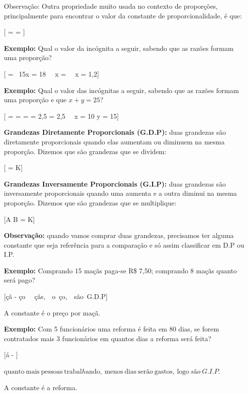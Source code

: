 {Observação}: Outra propriedade muito usada no contexto de proporções,
principalmente para encontrar o valor da constante de proporcionalidade,
é que:

[ =  = ]

\textbf{Exemplo:} Qual o valor da incógnita a seguir, sabendo que as
razões formam uma proporção?

[ = \  \rightarrow 15x = 18 \rightarrow \ \ x =  \rightarrow \ \ x = 1,2]

\textbf{Exemplo:} Qual o valor das incógnitas a seguir, sabendo que as
razões formam uma proporção e que \(x + y = 25\)?

[ =  =  =  = 2,5 = 2,5 \rightarrow \ \ x = 10 \rightarrow y = 15]

\textbf{{Grandezas Diretamente Proporcionais (G.D.P)}:} duas grandezas
são diretamente proporcionais quando elas aumentam ou diminuem na mesma
proporção. Dizemos que são grandezas que se dividem:

[ = K]

\textbf{{Grandezas Inversamente Proporcionais (G.I.P)}:} duas grandezas
são inversamente proporcionais quando uma aumenta e a outra diminui na
mesma proporção. Dizemos que são grandezas que se multiplique:

[A \times B = K]

\textbf{Observação:} quando vamos comprar duas grandezas, precisamos ter
alguma constante que seja referência para a comparação e só assim
classificar em D.P ou I.P.

\textbf{Exemplo:} Comprando 15 maçãs paga-se R\$ 7,50; comprando 8 maçãs
quanto será pago?

[çã - ço \rightarrow {}\ \ çãs,\ \ o\ ço,\ \ são\ G.D.P]

A constante é o preço por maçã.

\textbf{Exemplo:} Com 5 funcionários uma reforma é feita em 80 dias, se
forem contratados mais 3 funcionários em quantos dias a reforma será
feita?

[á - ]

\(\text{quanto}\ \text{mais}\ \text{pessoas}\ \text{trabal}h\text{ando},\ \text{menos}\ \text{dias}\ \text{ser}ão\ \text{gastos},\ \text{logo}\ são\ G.I.P\).

A constante é a reforma.

